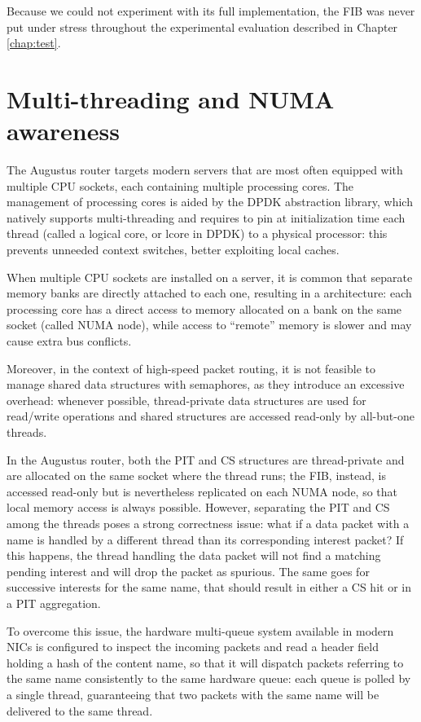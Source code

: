 \documentclass[11pt,a4paper,twoside,titlepage,openany]{book}
\newcommand{\mono}[1]{{\footnotesize \ttfamily #1}}
\begin{document}
Because we could not experiment with its full implementation, the \gls{FIB} was never put under stress throughout the experimental evaluation described in Chapter \ref{chap:test}.

\section{Multi-threading and NUMA awareness}\label{sec:augustus.numa}
The Augustus router targets modern servers that are most often equipped with multiple CPU sockets, each containing multiple processing cores. The management of processing cores is aided by the DPDK abstraction library, which natively supports multi-threading and requires to pin at initialization time each thread (called a logical core, or \mono{lcore} in DPDK) to a physical processor: this prevents unneeded context switches, better exploiting local caches.

When multiple CPU sockets are installed on a server, it is common that separate memory banks are directly attached to each one, resulting in a  architecture: each processing core has a direct access to memory allocated on a bank on the same socket (called NUMA node), while access to ``remote'' memory is slower and may cause extra bus conflicts.

Moreover, in the context of high-speed packet routing, it is not feasible to manage shared data structures with semaphores, as they introduce an excessive overhead: whenever possible, thread-private data structures are used for read/write operations and shared structures are accessed read-only by all-but-one threads.

In the Augustus router, both the \gls{PIT} and \gls{CS} structures are thread-private and are allocated on the same socket where the thread runs; the \gls{FIB}, instead, is accessed read-only but is nevertheless replicated on each NUMA node, so that local memory access is always possible.
However, separating the \gls{PIT} and \gls{CS} among the threads poses a strong correctness issue: what if a data packet with a name is handled by a different thread than its corresponding interest packet? If this happens, the thread handling the data packet will not find a matching pending interest and will drop the packet as spurious. The same goes for successive interests for the same name, that should result in either a CS hit or in a PIT aggregation.

To overcome this issue, the hardware multi-queue system available in modern NICs is configured to inspect the incoming packets and read a header field holding a hash of the content name, so that it will dispatch packets referring to the same name consistently to the same hardware queue: each queue is polled by a single thread, guaranteeing that two packets with the same name will be delivered to the same thread.
\end{document}
